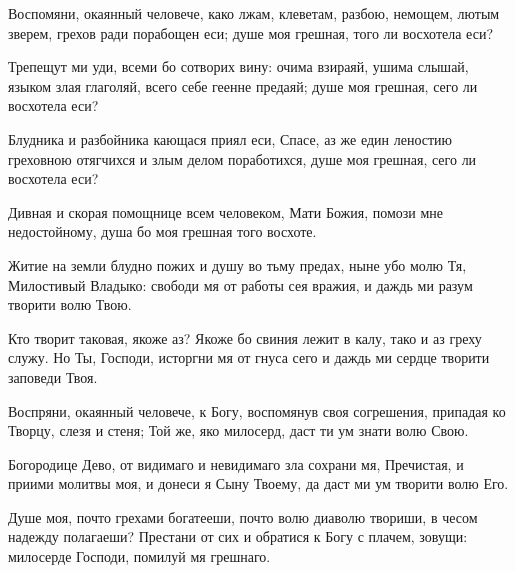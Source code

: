 \begin{mymulticols}

Воспомяни, окаянный человече, како лжам, клеветам, разбою, немощем, лютым зверем, грехов ради порабощен еси; душе моя грешная, того ли восхотела еси?


Трепещут ми уди, всеми бо сотворих вину: очима взираяй, ушима слышай, языком злая глаголяй, всего себе геенне предаяй; душе моя грешная, сего ли восхотела еси?

\slava

Блудника и разбойника кающася приял еси, Спасе, аз же един леностию греховною отягчихся и злым делом поработихся, душе моя грешная, сего ли восхотела еси?

\inyne

Дивная и скорая помощнице всем человеком, Мати Божия, помози мне недостойному, душа бо моя грешная того восхоте.




Житие на земли блудно пожих и душу во тьму предах, ныне убо молю Тя, Милостивый Владыко: свободи мя от работы сея вражия, и даждь ми разум творити волю Твою.


Кто творит таковая, якоже аз? Якоже бо свиния лежит в калу, тако и аз греху служу. Но Ты, Господи, исторгни мя от гнуса сего и даждь ми сердце творити заповеди Твоя.

\slava

Воспряни, окаянный человече, к Богу, воспомянув своя согрешения, припадая ко Творцу, слезя и стеня; Той же, яко милосерд, даст ти ум знати волю Свою.

\inyne

Богородице Дево, от видимаго и невидимаго зла сохрани мя, Пречистая, и приими молитвы моя, и донеси я Сыну Твоему, да даст ми ум творити волю Его.


Душе моя, почто грехами богатееши, почто волю диаволю твориши, в чесом надежду полагаеши? Престани от сих и обратися к Богу с плачем, зовущи: милосерде Господи, помилуй мя грешнаго.



\end{mymulticols}
